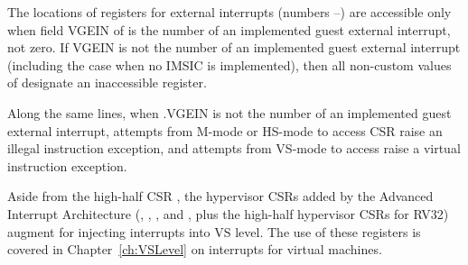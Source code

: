 The locations of registers for external interrupts (numbers
--) are accessible only when field VGEIN of 
is the number of an implemented guest external interrupt, not zero.
If VGEIN is not the number of an implemented guest external interrupt
(including the case when no IMSIC is implemented), then all non-custom
values of  designate an inaccessible register.

Along the same lines, when .VGEIN is not the number of
an implemented guest external interrupt, attempts from \mbox{M-mode}
or \mbox{HS-mode} to access CSR 
raise an illegal instruction exception,
and attempts from \mbox{VS-mode} to access  raise a
virtual instruction exception.

Aside from the high-half CSR , the hypervisor CSRs added
by the Advanced Interrupt Architecture (, ,
, and , plus the high-half hypervisor CSRs for
RV32) augment  for injecting interrupts into VS level.
The use of these registers is covered in Chapter~\ref{ch:VSLevel} on
interrupts for virtual machines.

